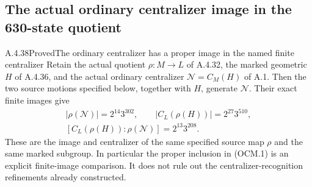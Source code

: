 \subsection{The actual ordinary centralizer image in the 630-state quotient}

\begin{result}{A.4.38}{Proved}{The ordinary centralizer has a proper image in the named finite centralizer}
\label{thm:sphere10-ordinary-centralizer-image}
Retain the actual quotient $\rho:M\to L$ of A.4.32,
the marked geometric $H$ of A.4.36, and the actual
ordinary centralizer $\mathcal N=C_M(H)$ of A.1.
Then the two source motions specified below, together
with $H$, generate $\mathcal N$.  Their exact finite
images give
\[
\begin{gathered}
 |\rho(\mathcal N)|=2^{14}3^{302},\qquad
 |C_L(\rho(H))|=2^{27}3^{510},\\
 [C_L(\rho(H)):\rho(\mathcal N)]=2^{13}3^{208}.
\end{gathered}                                                  \tag{OCM.1}
\]
These are the image and centralizer of the same specified
source map $\rho$ and the same marked subgroup.
In particular the proper inclusion in (OCM.1) is an
explicit finite-image comparison.  It does not rule out
the centralizer-recognition refinements already constructed.
\end{result}

